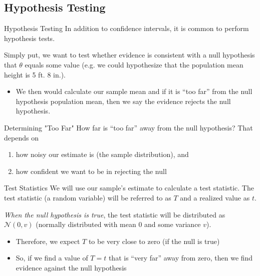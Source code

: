 \documentclass[aspectratio=169,t,11pt,table]{beamer}
\begin{document}
\subsection*{Hypothesis Testing}

\begin{frame}{Hypothesis Testing}
  In addition to confidence intervals, it is common to perform \alert{hypothesis tests}. 
  
  \bigskip
  Simply put, we want to test whether evidence is consistent with a \alert{null hypothesis} that $\theta$ equals some value (e.g. we could hypothesize that the population mean height is 5 ft. 8 in.). 
  \begin{itemize}
    \item We then would calculate our sample mean and if it is ``too far'' from the null hypothesis population mean, then we say the evidence rejects the null hypothesis.
  \end{itemize}
\end{frame}

\begin{frame}{Determining "Too Far"}
  How far is ``too far'' away from the null hypothesis? That depends on 
  \begin{enumerate}
    \item how noisy our estimate is (the sample distribution), and 
    
    \item how confident we want to be in rejecting the null
  \end{enumerate}
\end{frame}

\begin{frame}{Test Statistics}
  We will use our sample's estimate to calculate a \alert{test statistic}. The test statistic (a random variable) will be referred to as $T$ and a realized value as $t$. 

  \bigskip
  \emph{When the null hypothesis is true}, the test statistic will be distributed as $\mathcal{N}(0, v)$ (normally distributed with mean $0$ and some variance $v$). 
  \pause
  \begin{itemize}
    \item Therefore, we expect $T$ to be very close to zero (if the null is true)
    
    \item So, if we find a value of $T = t$ that is ``very far'' away from zero, then we find evidence against the null hypothesis
  \end{itemize}
\end{frame}
\end{document}
